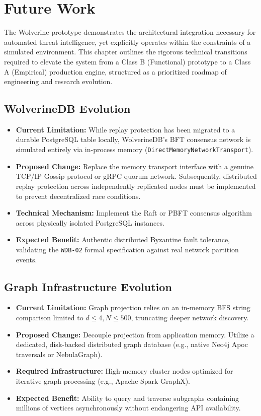 \chapter{Future Work}
\label{ch:future-work}

The Wolverine prototype demonstrates the architectural integration necessary for automated threat intelligence, yet explicitly operates within the constraints of a simulated environment. This chapter outlines the rigorous technical transitions required to elevate the system from a Class B (Functional) prototype to a Class A (Empirical) production engine, structured as a prioritized roadmap of engineering and research evolution.

\section{WolverineDB Evolution}
\label{sec:fw-wolverinedb}
\begin{itemize}
    \item \textbf{Current Limitation:} While replay protection has been migrated to a durable PostgreSQL table locally, WolverineDB's BFT consensus network is simulated entirely via in-process memory (\texttt{DirectMemoryNetworkTransport}).
    \item \textbf{Proposed Change:} Replace the memory transport interface with a genuine TCP/IP Gossip protocol or gRPC quorum network. Subsequently, distributed replay protection across independently replicated nodes must be implemented to prevent decentralized race conditions.
    \item \textbf{Technical Mechanism:} Implement the Raft or PBFT consensus algorithm across physically isolated PostgreSQL instances.
    \item \textbf{Expected Benefit:} Authentic distributed Byzantine fault tolerance, validating the \texttt{WDB-02} formal specification against real network partition events.
\end{itemize}

\section{Graph Infrastructure Evolution}
\label{sec:fw-graph}
\begin{itemize}
    \item \textbf{Current Limitation:} Graph projection relies on an in-memory BFS string comparison limited to $d \le 4, N \le 500$, truncating deeper network discovery.
    \item \textbf{Proposed Change:} Decouple projection from application memory. Utilize a dedicated, disk-backed distributed graph database (e.g., native Neo4j Apoc traversals or NebulaGraph).
    \item \textbf{Required Infrastructure:} High-memory cluster nodes optimized for iterative graph processing (e.g., Apache Spark GraphX).
    \item \textbf{Expected Benefit:} Ability to query and traverse subgraphs containing millions of vertices asynchronously without endangering API availability.
\end{itemize}

